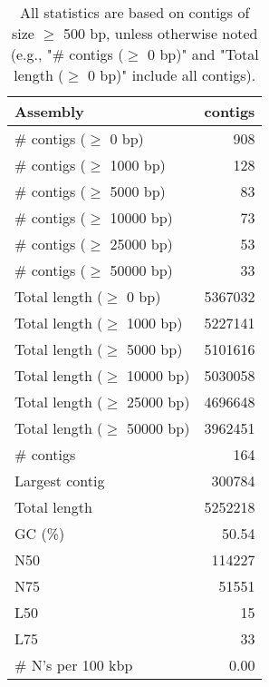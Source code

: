 \documentclass[12pt,a4paper]{article}
\begin{document}
\begin{table}[ht]
\begin{center}
\caption{All statistics are based on contigs of size $\geq$ 500 bp, unless otherwise noted (e.g., "\# contigs ($\geq$ 0 bp)" and "Total length ($\geq$ 0 bp)" include all contigs).}
\begin{tabular}{|l*{1}{|r}|}
\hline
Assembly & contigs \\ \hline
\# contigs ($\geq$ 0 bp) & 908 \\ \hline
\# contigs ($\geq$ 1000 bp) & 128 \\ \hline
\# contigs ($\geq$ 5000 bp) & 83 \\ \hline
\# contigs ($\geq$ 10000 bp) & 73 \\ \hline
\# contigs ($\geq$ 25000 bp) & 53 \\ \hline
\# contigs ($\geq$ 50000 bp) & 33 \\ \hline
Total length ($\geq$ 0 bp) & 5367032 \\ \hline
Total length ($\geq$ 1000 bp) & 5227141 \\ \hline
Total length ($\geq$ 5000 bp) & 5101616 \\ \hline
Total length ($\geq$ 10000 bp) & 5030058 \\ \hline
Total length ($\geq$ 25000 bp) & 4696648 \\ \hline
Total length ($\geq$ 50000 bp) & 3962451 \\ \hline
\# contigs & 164 \\ \hline
Largest contig & 300784 \\ \hline
Total length & 5252218 \\ \hline
GC (\%) & 50.54 \\ \hline
N50 & 114227 \\ \hline
N75 & 51551 \\ \hline
L50 & 15 \\ \hline
L75 & 33 \\ \hline
\# N's per 100 kbp & 0.00 \\ \hline
\end{tabular}
\end{center}
\end{table}
\end{document}
